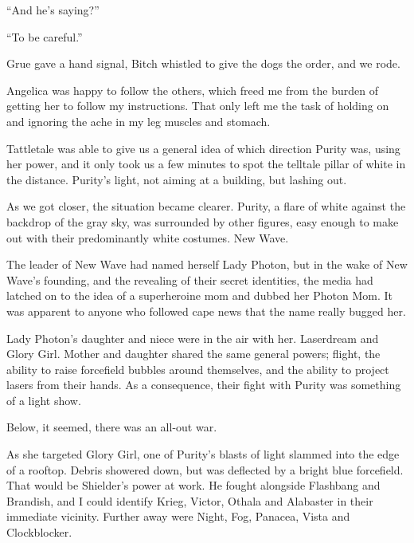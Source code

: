 ``And he's saying?''



``To be careful.''



Grue gave a hand signal, Bitch whistled to give the dogs the order, and we rode.



Angelica was happy to follow the others, which freed me from the burden of getting her to follow my instructions.  That only left me the task of holding on and ignoring the ache in my leg muscles and stomach.



Tattletale was able to give us a general idea of which direction Purity was, using her power, and it only took us a few minutes to spot the telltale pillar of white in the distance.  Purity's light, not aiming at a building, but lashing out.



As we got closer, the situation became clearer.  Purity, a flare of white against the backdrop of the gray sky, was surrounded by other figures, easy enough to make out with their predominantly white costumes.  New Wave.



The leader of New Wave had named herself Lady Photon, but in the wake of New Wave's founding, and the revealing of their secret identities, the media had latched on to the idea of a superheroine mom and dubbed her Photon Mom.  It was apparent to anyone who followed cape news that the name really bugged her.



Lady Photon's daughter and niece were in the air with her.  Laserdream and Glory Girl.  Mother and daughter shared the same general powers; flight, the ability to raise forcefield bubbles around themselves, and the ability to project lasers from their hands.  As a consequence, their fight with Purity was something of a light show.



Below, it seemed, there was an all-out war.



As she targeted Glory Girl, one of Purity's blasts of light slammed into the edge of a rooftop.  Debris showered down, but was deflected by a bright blue forcefield.  That would be Shielder's power at work.  He fought alongside Flashbang and Brandish, and I could identify Krieg, Victor, Othala and Alabaster in their immediate vicinity.  Further away were Night, Fog, Panacea, Vista and Clockblocker.



